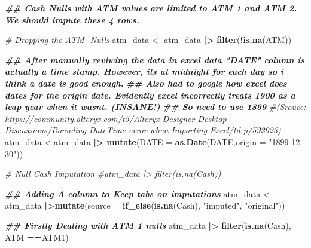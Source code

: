 \documentclass[
]{article}
\newenvironment{Shaded}{\begin{snugshade}}{\end{snugshade}}
\newcommand{\AttributeTok}[1]{\textcolor[rgb]{0.13,0.29,0.53}{#1}}
\newcommand{\CommentTok}[1]{\textcolor[rgb]{0.56,0.35,0.01}{\textit{#1}}}
\newcommand{\DocumentationTok}[1]{\textcolor[rgb]{0.56,0.35,0.01}{\textbf{\textit{#1}}}}
\newcommand{\FunctionTok}[1]{\textcolor[rgb]{0.13,0.29,0.53}{\textbf{#1}}}
\newcommand{\NormalTok}[1]{#1}
\newcommand{\OtherTok}[1]{\textcolor[rgb]{0.56,0.35,0.01}{#1}}
\newcommand{\SpecialCharTok}[1]{\textcolor[rgb]{0.81,0.36,0.00}{\textbf{#1}}}
\newcommand{\StringTok}[1]{\textcolor[rgb]{0.31,0.60,0.02}{#1}}
\begin{document}
\begin{Shaded}
\begin{Highlighting}[]
\DocumentationTok{\#\# Cash Nulls with ATM values are limited to ATM 1 and ATM 2. We should impute these 4 rows. }

\CommentTok{\# Dropping the ATM\_Nulls}
\NormalTok{atm\_data }\OtherTok{\textless{}{-}}\NormalTok{ atm\_data }\SpecialCharTok{|\textgreater{}} \FunctionTok{filter}\NormalTok{(}\SpecialCharTok{!}\FunctionTok{is.na}\NormalTok{(ATM))}
\end{Highlighting}
\end{Shaded}

\begin{Shaded}
\begin{Highlighting}[]
\DocumentationTok{\#\# After manually reviwing the data in excel data "DATE" column is actually a time stamp. However, its at midnight for each day so i think a date is good enough. }
\DocumentationTok{\#\# Also had to google how excel does dates for the origin date. Evidently excel incorrectly treats 1900 as a leap year when it wasnt. (INSANE!)}
\DocumentationTok{\#\# So need to use 1899}
\CommentTok{\#(Srouce: https://community.alteryx.com/t5/Alteryx{-}Designer{-}Desktop{-}Discussions/Rounding{-}DateTime{-}error{-}when{-}Importing{-}Excel/td{-}p/592023)}
\NormalTok{atm\_data }\OtherTok{\textless{}{-}}\NormalTok{atm\_data }\SpecialCharTok{|\textgreater{}} \FunctionTok{mutate}\NormalTok{(}\AttributeTok{DATE =} \FunctionTok{as.Date}\NormalTok{(DATE,}\AttributeTok{origin =} \StringTok{"1899{-}12{-}30"}\NormalTok{))}

\CommentTok{\# Null Cash Imputation}
\CommentTok{\#atm\_data |\textgreater{} filter(is.na(Cash))}

\DocumentationTok{\#\# Adding A column to Keep tabs on imputations}
\NormalTok{atm\_data }\OtherTok{\textless{}{-}}\NormalTok{ atm\_data }\SpecialCharTok{|\textgreater{}}\FunctionTok{mutate}\NormalTok{(}\AttributeTok{source =} \FunctionTok{if\_else}\NormalTok{(}\FunctionTok{is.na}\NormalTok{(Cash), }\StringTok{"imputed"}\NormalTok{, }\StringTok{"original"}\NormalTok{))}

\DocumentationTok{\#\# Firstly Dealing with ATM 1 nulls }
\NormalTok{atm\_data }\SpecialCharTok{|\textgreater{}} \FunctionTok{filter}\NormalTok{(}\FunctionTok{is.na}\NormalTok{(Cash), ATM }\SpecialCharTok{==}\StringTok{\textquotesingle{}ATM1\textquotesingle{}}\NormalTok{)}
\end{Highlighting}
\end{Shaded}
\end{document}
